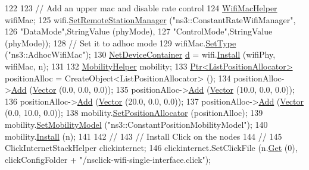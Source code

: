 \begin{DoxyCode}
122 
123   \textcolor{comment}{// Add an upper mac and disable rate control}
124   \hyperlink{classns3_1_1WifiMacHelper}{WifiMacHelper} wifiMac;
125   wifi.\hyperlink{classns3_1_1WifiHelper_a3d01b178aeb2de246ab5a3aa5638ce24}{SetRemoteStationManager} (\textcolor{stringliteral}{"ns3::ConstantRateWifiManager"},
126                                 \textcolor{stringliteral}{"DataMode"},StringValue (phyMode),
127                                 \textcolor{stringliteral}{"ControlMode"},StringValue (phyMode));
128   \textcolor{comment}{// Set it to adhoc mode}
129   wifiMac.\hyperlink{classns3_1_1WifiMacHelper_a382d8df76a1dd7007179d1963b4b6bc6}{SetType} (\textcolor{stringliteral}{"ns3::AdhocWifiMac"});
130   \hyperlink{classns3_1_1NetDeviceContainer}{NetDeviceContainer} \hyperlink{buildings__pathloss_8m_a9f9b934daed17a4d3613b6886ff4cf4b}{d} = wifi.\hyperlink{classns3_1_1WifiHelper_a451b3d33fa1497c22f06c5451f57a127}{Install} (wifiPhy, wifiMac, n);
131 
132   \hyperlink{classns3_1_1MobilityHelper}{MobilityHelper} mobility;
133   \hyperlink{classns3_1_1Ptr}{Ptr<ListPositionAllocator>} positionAlloc = CreateObject<ListPositionAllocator> 
      ();
134   positionAlloc->\hyperlink{classns3_1_1ListPositionAllocator_a460e82f015ac012a73ba0ea0cccb3486}{Add} (\hyperlink{classns3_1_1Vector3D_a7e59b47bc94c9cb1dadff68c1d0112d8}{Vector} (0.0, 0.0, 0.0));
135   positionAlloc->\hyperlink{classns3_1_1ListPositionAllocator_a460e82f015ac012a73ba0ea0cccb3486}{Add} (\hyperlink{classns3_1_1Vector3D_a7e59b47bc94c9cb1dadff68c1d0112d8}{Vector} (10.0, 0.0, 0.0));
136   positionAlloc->\hyperlink{classns3_1_1ListPositionAllocator_a460e82f015ac012a73ba0ea0cccb3486}{Add} (\hyperlink{classns3_1_1Vector3D_a7e59b47bc94c9cb1dadff68c1d0112d8}{Vector} (20.0, 0.0, 0.0));
137   positionAlloc->\hyperlink{classns3_1_1ListPositionAllocator_a460e82f015ac012a73ba0ea0cccb3486}{Add} (\hyperlink{classns3_1_1Vector3D_a7e59b47bc94c9cb1dadff68c1d0112d8}{Vector} (0.0, 10.0, 0.0));
138   mobility.\hyperlink{classns3_1_1MobilityHelper_ac59d5295076be3cc11021566713a28c5}{SetPositionAllocator} (positionAlloc);
139   mobility.\hyperlink{classns3_1_1MobilityHelper_a030275011b6f40682e70534d30280aba}{SetMobilityModel} (\textcolor{stringliteral}{"ns3::ConstantPositionMobilityModel"});
140   mobility.\hyperlink{classns3_1_1MobilityHelper_a07737960ee95c0777109cf2994dd97ae}{Install} (n);
141 
142   \textcolor{comment}{//}
143   \textcolor{comment}{// Install Click on the nodes}
144   \textcolor{comment}{//}
145   ClickInternetStackHelper clickinternet;
146   clickinternet.SetClickFile (n.\hyperlink{classns3_1_1NodeContainer_a9ed96e2ecc22e0f5a3d4842eb9bf90bf}{Get} (0), clickConfigFolder + \textcolor{stringliteral}{"/nsclick-wifi-single-interface.click"});

\end{DoxyCode}
